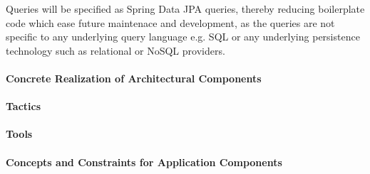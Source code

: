 Queries will be specified as Spring Data JPA queries, thereby reducing 
boilerplate code which ease future maintenace and development, as the queries
are not specific to any underlying query language e.g. SQL or any underlying 
persistence technology such as relational or NoSQL providers.

\paragraph{Concrete Realization of Architectural Components}
\paragraph{Tactics}
\paragraph{Tools}
\paragraph{Concepts and Constraints for Application Components}